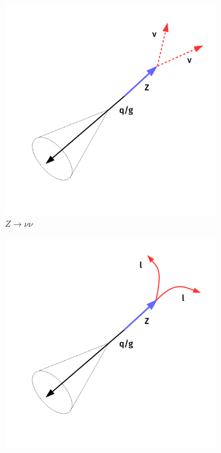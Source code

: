 \begin{figure}[]
    \begin{center}
        \begin{subfigure}[t]{0.49\textwidth}
            \includegraphics[width=\textwidth]{figures/monotop/diagrams/zsr.pdf}
            \caption{$Z\rightarrow\nu\nu$}
        \end{subfigure}
        \begin{subfigure}[t]{0.49\textwidth}
            \includegraphics[width=\textwidth]{figures/monotop/diagrams/zcr.pdf}

\end{subfigure}
\end{center}
\end{figure}
